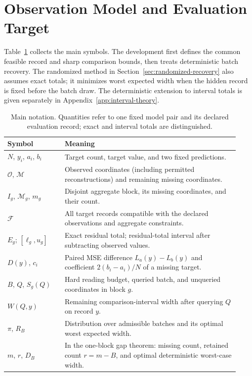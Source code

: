 \documentclass[12pt]{article}
\newcommand{\F}{\mathcal{F}}
\newcommand{\M}{\mathcal{M}}
\newcommand{\Oset}{\mathcal{O}}
\begin{document}
\section{Observation Model and Evaluation Target}

Table~\ref{tab:notation} collects the main symbols. The development first
defines the common feasible record and sharp comparison bounds, then treats
deterministic batch recovery. The randomized method in
Section~\ref{sec:randomized-recovery} also assumes exact totals; it minimizes
worst expected width when the hidden record is fixed before the batch draw.
The deterministic extension to interval totals is given separately in
Appendix~\ref{app:interval-theory}.

\begin{table}[htbp]\centering\small
\caption{Main notation. Quantities refer to one fixed model pair and its
declared evaluation record; exact and interval totals are distinguished.}
\label{tab:notation}
\begin{tabular}{p{0.23\linewidth}p{0.70\linewidth}}\toprule
Symbol & Meaning\\\midrule
$N$, $y_i$, $a_i$, $b_i$ & Target count, target value, and two fixed predictions.\\
$\Oset$, $\M$ & Observed coordinates (including permitted reconstructions) and remaining missing coordinates.\\
$I_g$, $\M_g$, $m_g$ & Disjoint aggregate block, its missing coordinates, and their count.\\
$\F$ & All target records compatible with the declared observations and aggregate constraints.\\
$E_g$; $[\ell_g,u_g]$ & Exact residual total; residual-total interval after subtracting observed values.\\
$D(y)$, $c_i$ & Paired MSE difference $L_a(y)-L_b(y)$ and coefficient $2(b_i-a_i)/N$ of a missing target.\\
$B$, $Q$, $S_g(Q)$ & Hard reading budget, queried batch, and unqueried coordinates in block $g$.\\
$W(Q,y)$ & Remaining comparison-interval width after querying $Q$ on record $y$.\\
$\pi$, $R_B$ & Distribution over admissible batches and its optimal worst expected width.\\
$m$, $r$, $D_B$ & In the one-block gap theorem: missing count, retained count $r=m-B$, and optimal deterministic worst-case width.\\
\bottomrule\end{tabular}
\end{table}
\end{document}
